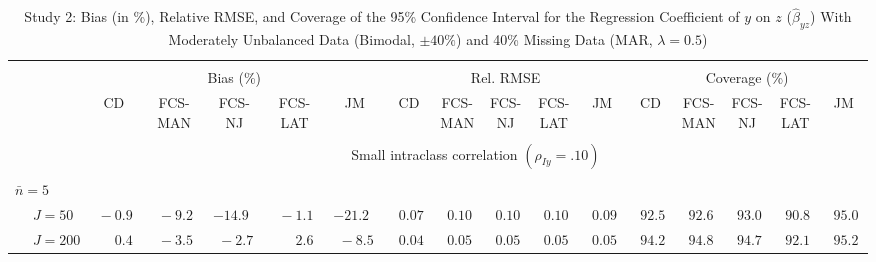 \begin{sidewaystable}
\begin{threeparttable}
\setlength{\tabcolsep}{1.0pt}
\renewcommand{\arraystretch}{0.95}
\footnotesize
\caption{\small Study 2: Bias (in \%), Relative RMSE, and Coverage of the 95\% Confidence Interval for the Regression Coefficient of $y$ on $z$ ($\hat\beta_{yz}$) With Moderately Unbalanced Data (Bimodal, $\pm 40\%$) and 40\% Missing Data (MAR, $\lambda=0.5$)}
\begin{tabular}{llccccccccccccccc}
\hline\\[-1.8ex]
& & \multicolumn{5}{c}{Bias (\%)} & \multicolumn{5}{c}{Rel. RMSE} & \multicolumn{5}{c}{Coverage (\%)} \\ \cmidrule(r){3-7}\cmidrule(r){8-12}\cmidrule(r){13-17}
 &  & CD & \makecell{FCS-\\MAN} & \makecell{FCS-\\NJ} & \makecell{FCS-\\LAT} & JM & CD & \makecell{FCS-\\MAN} & \makecell{FCS-\\NJ} & \makecell{FCS-\\LAT} & JM & CD & \makecell{FCS-\\MAN} & \makecell{FCS-\\NJ} & \makecell{FCS-\\LAT} & \multicolumn{1}{c}{JM} \\ 
[0.4ex]\hline\\[-1.8ex]
& & \multicolumn{15}{c}{Small intraclass correlation $(\rho_{Iy}=.10)$} \\[0.6ex]\hline\\[-1.8ex]
\multicolumn{4}{l}{$\bar{n}=5$} \\  & \nopagebreak $\;J=50$  & $\phantom{0}{-}0.9\phantom{0}$ & $\phantom{0}{-}9.2\phantom{0}$ & ${-}14.9\phantom{0}$ & $\phantom{0}{-}1.1\phantom{0}$ & ${-}21.2\phantom{0}$ & $\phantom{0}0.07\phantom{0}$ & $\phantom{0}0.10\phantom{0}$ & $\phantom{0}0.10\phantom{0}$ & $\phantom{0}0.10\phantom{0}$ & $\phantom{0}0.09\phantom{0}$ & $\phantom{0}92.5\phantom{0}$ & $\phantom{0}92.6\phantom{0}$ & $\phantom{0}93.0\phantom{0}$ & $\phantom{0}90.8\phantom{0}$ & $\phantom{0}95.0\phantom{0}$ \\
 & \nopagebreak $\;J=200$  & $\phantom{0}\phantom{-}0.4\phantom{0}$ & $\phantom{0}{-}3.5\phantom{0}$ & $\phantom{0}{-}2.7\phantom{0}$ & $\phantom{0}\phantom{-}2.6\phantom{0}$ & $\phantom{0}{-}8.5\phantom{0}$ & $\phantom{0}0.04\phantom{0}$ & $\phantom{0}0.05\phantom{0}$ & $\phantom{0}0.05\phantom{0}$ & $\phantom{0}0.05\phantom{0}$ & $\phantom{0}0.05\phantom{0}$ & $\phantom{0}94.2\phantom{0}$ & $\phantom{0}94.8\phantom{0}$ & $\phantom{0}94.7\phantom{0}$ & $\phantom{0}92.1\phantom{0}$ & $\phantom{0}95.2\phantom{0}$ \\

\end{tabular}
\end{threeparttable}
\end{sidewaystable}
